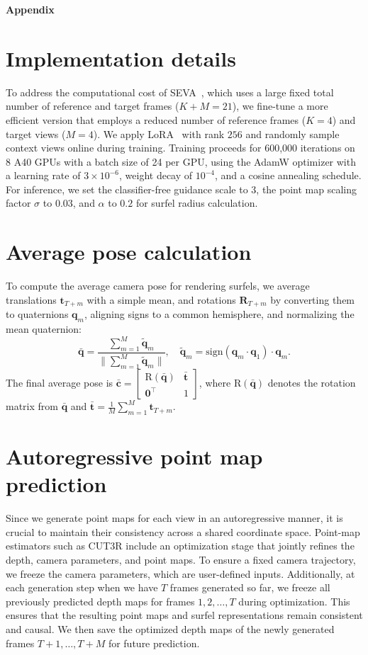 \appendix
\begin{center}
\large\textbf{Appendix}
\end{center}

\section{Implementation details}
\label{appen:implementation}
To address the computational cost of SEVA~\cite{seva}, which uses a large fixed total number of reference and target frames ($K+M=21$), we fine-tune a more efficient version that employs a reduced number of reference frames ($K=4$) and target views ($M=4$).
We apply LoRA~\cite{hu22lora:} with rank $256$ and randomly sample context views online during training.
Training proceeds for 600,000 iterations on 8 A40 GPUs with a batch size of 24 per GPU, using the AdamW optimizer with a learning rate of $3\times 10^{-6}$, weight decay of $10^{-4}$, and a cosine annealing schedule.
For inference, we set the classifier-free guidance scale to $3$, the point map scaling factor $\sigma$ to $0.03$, and $\alpha$ to $0.2$ for surfel radius calculation.

\section{Average pose calculation}
\label{appen:average_camera}
To compute the average camera pose for rendering surfels, we average translations $\mathbf{t}_{T+m}$ with a simple mean, and rotations $\mathbf{R}_{T+m}$ by converting them to quaternions $\mathbf{q}_m$, aligning signs to a common hemisphere, and normalizing the mean quaternion:
\[
\bar{\mathbf{q}} = \frac{\sum_{m=1}^M \tilde{\mathbf{q}}_m}{\|\sum_{m=1}^M \tilde{\mathbf{q}}_m\|}, \quad \tilde{\mathbf{q}}_m = \text{sign}(\mathbf{q}_m \cdot \mathbf{q}_1) \cdot \mathbf{q}_m.
\]
The final average pose is $\bar{\mathbf{c}} = \begin{bmatrix} \mathrm{R}(\bar{\mathbf{q}}) & \bar{\mathbf{t}} \\ \mathbf{0}^\top & 1 \end{bmatrix}$, where $\mathrm{R}(\bar{\mathbf{q}})$ denotes the rotation matrix from $\bar{\mathbf{q}}$ and $\bar{\mathbf{t}} = \frac{1}{M}\sum_{m=1}^M \mathbf{t}_{T+m}$. 

\section{Autoregressive point map prediction}
Since we generate point maps for each view in an autoregressive manner, it is crucial to maintain their consistency across a shared coordinate space. Point-map estimators such as CUT3R include an optimization stage that jointly refines the depth, camera parameters, and point maps. To ensure a fixed camera trajectory, we freeze the camera parameters, which are user-defined inputs. Additionally, at each generation step when we have $T$ frames generated so far, we freeze all previously predicted depth maps for frames $1, 2, \ldots, T$ during optimization. This ensures that the resulting point maps and surfel representations remain consistent and causal. We then save the optimized depth maps of the newly generated frames $T+1, \ldots, T+M$ for future prediction.



